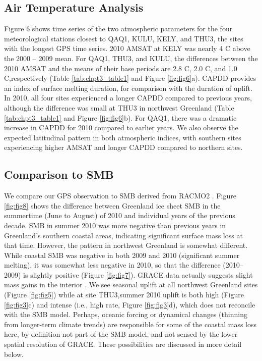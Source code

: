 \subsection{Air Temperature Analysis}
Figure 6 shows time series of the two atmospheric parameters for the four meteorological stations closest to QAQ1, KULU, KELY, and THU3, the sites with the longest GPS time series. 2010 AMSAT at KELY was nearly 4 \textordmasculine C above the 2000 – 2009 mean. For QAQ1, THU3, and KULU, the differences between the 2010 AMSAT and the means of their base periods are 2.8 \textordmasculine C, 2.0 \textordmasculine C, and 1.0 \textordmasculine C,respectively (Table \ref{tab:chpt3_table1} and Figure \ref{fig:fig6}a). CAPDD provides an index of surface melting duration, for comparison with the duration of uplift. In 2010, all four sites experienced a longer CAPDD compared to previous years, although the difference was small at THU3 in northwest Greenland (Table \ref{tab:chpt3_table1} and Figure \ref{fig:fig6}b). For QAQ1, there was a dramatic increase in CAPDD for 2010 compared to earlier years. We also observe the expected latitudinal pattern in both atmospheric indices, with southern sites experiencing higher AMSAT and longer CAPDD compared to northern sites.

\subsection{Comparison to SMB}
We compare our GPS observation to SMB
derived from RACMO2 \cite[]{ettema2009higher,ettema2010climateA,ettema2010climateB}. Figure \ref{fig:fig8} shows the difference between Greenland ice sheet SMB in the summertime
(June to August) of 2010 and individual years of
the previous decade. SMB in summer 2010 was
more negative than previous years in Greenland’s
southern coastal areas, indicating significant surface
mass loss at that time. However, the pattern in
northwest Greenland is somewhat different. While
coastal SMB was negative in both 2009 and 2010
(significant summer melting), it was somewhat less
negative in 2010, so that the difference (2010–2009)
is slightly positive (Figure \ref{fig:fig7}). GRACE data actually
suggests slight mass gains in the interior \cite[]{bevis2012bedrock}. We see seasonal uplift at all northwest
Greenland sites (Figure \ref{fig:fig5}) while at site THU3,summer 2010 uplift is both high (Figure \ref{fig:fig3}c) and
intense (i.e., high rate, Figure \ref{fig:fig3}d), which does not
reconcile with the SMB model. Perhaps, oceanic
forcing or dynamical changes (thinning from
longer-term climate trends) are responsible for
some of the coastal mass loss here, by definition
not part of the SMB model, and not sensed by
the lower spatial resolution of GRACE. These
possibilities are discussed in more detail below.

